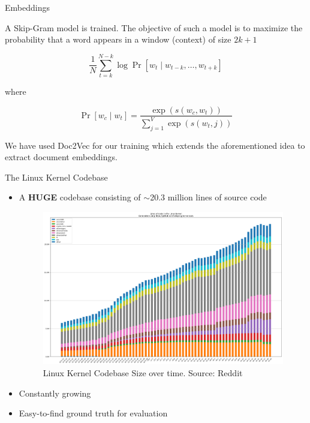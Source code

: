 \documentclass{beamer}
\begin{document}
\begin{frame}{Embeddings}

A Skip-Gram model is trained. The objective of such a model is to maximize the probability that a word appears in a window (context) of size $2k + 1$

$$\frac {1} {N} \sum_{t = k}^{N - k} \log \Pr [w_t \mid w_{t-k}, \dots, w_{t + k}]$$

where 

$$\Pr [w_c \mid w_t] = \frac {\exp(s(w_c, w_t))} {\sum_{j = 1}^{V} \exp(s(w_t, j))}$$

We have used Doc2Vec for our training which extends the aforementioned idea to extract document embeddings.
    
\end{frame}

\begin{frame}{The Linux Kernel Codebase}
    \begin{itemize}
        \item A \textbf{HUGE} codebase consisting of $\sim$20.3 million lines of source code
        \begin{figure}
            \centering
            \includegraphics[scale=0.15]{linux.png}
            \caption{Linux Kernel Codebase Size over time. Source: Reddit}
            \label{fig:linux}
        \end{figure}
        
        \item Constantly growing
        \item Easy-to-find ground truth for evaluation
    \end{itemize}
    
    
\end{frame}
\end{document}
